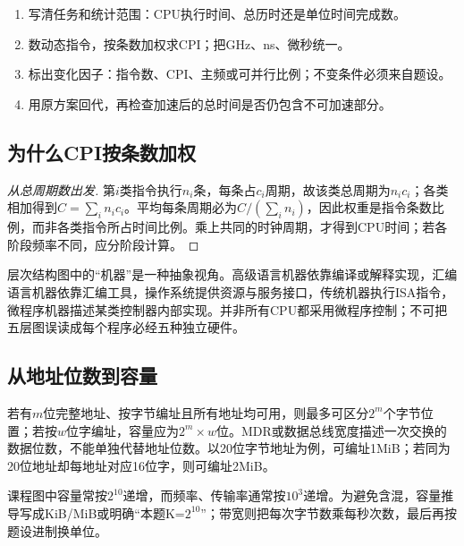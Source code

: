 \begin{methodbox}[性能题四步]

\begin{enumerate}
\def\labelenumi{\arabic{enumi}.}
\tightlist
\item
  写清任务和统计范围：CPU执行时间、总历时还是单位时间完成数。
\item
  数动态指令，按条数加权求CPI；把GHz、ns、微秒统一。
\item
  标出变化因子：指令数、CPI、主频或可并行比例；不变条件必须来自题设。
\item
  用原方案回代，再检查加速后的总时间是否仍包含不可加速部分。
\end{enumerate}

\end{methodbox}

\subsection{为什么CPI按条数加权}\label{CO01-proof}

\begin{proof}[从总周期数出发]

第\(i\)类指令执行\(n_i\)条，每条占\(c_i\)周期，故该类总周期为\(n_ic_i\)；各类相加得到\(C=\sum_i n_ic_i\)。平均每条周期必为\(C/(\sum_i n_i)\)，因此权重是指令条数比例，而非各类指令所占时间比例。乘上共同的时钟周期，才得到CPU时间；若各阶段频率不同，应分阶段计算。

\end{proof}

层次结构图中的``机器''是一种抽象视角。高级语言机器依靠编译或解释实现，汇编语言机器依靠汇编工具，操作系统提供资源与服务接口，传统机器执行ISA指令，微程序机器描述某类控制器内部实现。并非所有CPU都采用微程序控制；不可把五层图误读成每个程序必经五种独立硬件。

\subsection{从地址位数到容量}\label{CO01-capacity}

若有\(m\)位完整地址、按字节编址且所有地址均可用，则最多可区分\(2^m\)个字节位置；若按\(w\)位字编址，容量应为\(2^m\times w\)位。MDR或数据总线宽度描述一次交换的数据位数，不能单独代替地址位数。以20位字节地址为例，可编址1MiB；若同为20位地址却每地址对应16位字，则可编址2MiB。

课程图中容量常按\(2^{10}\)递增，而频率、传输率通常按\(10^3\)递增。为避免含混，容量推导写成KiB/MiB或明确``本题K=\(2^{10}\)''；带宽则把每次字节数乘每秒次数，最后再按题设进制换单位。

